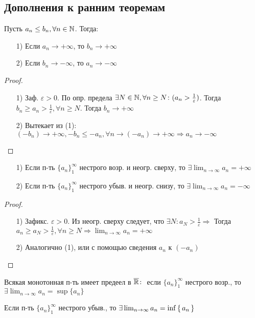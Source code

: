 \subsection{Дополнения к ранним теоремам}
\begin{theorem}[4']
Пусть $a_n \leq b_n, \forall n \in \mathbb{N}$. Тогда:
\begin{itemize}
  \item [1) ] Если $a_n \to +\infty$, то $b_n \to +\infty$
  \item [2) ] Если $b_n \to -\infty$, то $a_n \to -\infty$
\end{itemize}
\end{theorem}
\begin{proof}
\begin{itemize}
  \item[1) ] Заф. $\varepsilon > 0$. По опр. предела $\exists N \in \mathbb{N}, \forall n \geq N \colon (a_n > \frac{1}{\varepsilon})$. Тогда $b_n \geq a_n > \frac{1}{\varepsilon}, \forall n \geq N$. Тогда $b_n \to +\infty$
  \item [2)] Вытекает из (1): $(-b_n) \to +\infty, -b_n \leq -a_n, \forall n \rightarrow (-a_n) \to +\infty \Rightarrow a_n \to -\infty$
\end{itemize}
\end{proof}
\begin{theorem}[6']
\begin{itemize}
  \item[1) ] Если п-ть $\{a_n\}_{1}^{\infty}$ нестрого возр. и неогр. сверху, то $\exists\lim_{n\to\infty}a_n = +\infty$
  \item [2) ] Если п-ть $\{a_n\}_{1}^{\infty}$ нестрого убыв. и неогр. снизу, то $\exists\lim_{n\to\infty} a_n = -\infty$
\end{itemize}
\end{theorem}
\begin{proof}
\begin{itemize}
  \item[1)] Зафикс. $\varepsilon > 0$. Из неогр. сверху следует, что $\exists N \colon a_N > \frac{1}{\varepsilon} \Rightarrow $ Тогда $a_n \geq a_N > \frac{1}{\varepsilon}, \forall n \geq N \Rightarrow \lim_{n\to\infty} a_n = +\infty$
  \item [2) ] Аналогично (1), или с помощью сведения $a_n$ к $(-a_n)$
\end{itemize}
\end{proof}
\begin{consequence}
Всякая монотонная п-ть имеет предеел в $\overline{\mathbb{R}}\colon$ если $\{a_n\}_{1}^{\infty}$ нестрого возр., то $\exists \lim_{n\to\infty}a_n = \sup\{a_n\}$

Если п-ть $\{a_n\}_{1}^{\infty}$ нестрого убыв., то $\exists \lim_{n\to\infty} a_n = \inf \set{a_n}$
\end{consequence}
